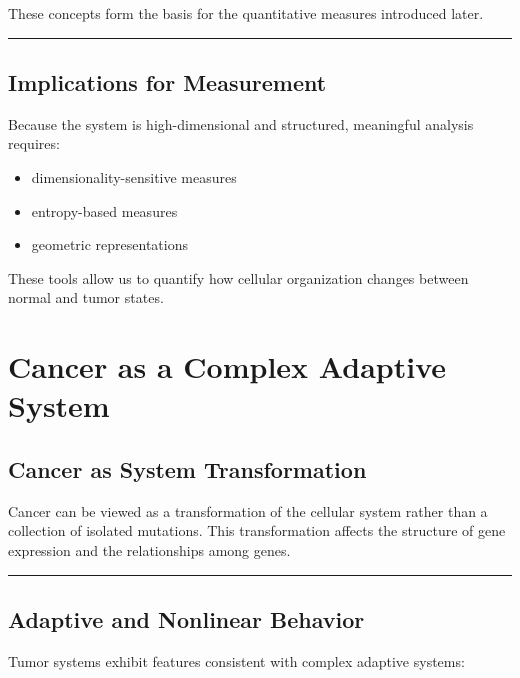 \documentclass[
  letterpaper,
  DIV=11,
  numbers=noendperiod,
  openany,
  oneside]{scrreprt}
\providecommand{\tightlist}{%
  \setlength{\itemsep}{0pt}\setlength{\parskip}{0pt}}
\begin{document}
These concepts form the basis for the quantitative measures introduced
later.

\begin{center}\rule{0.5\linewidth}{0.5pt}\end{center}

\section{Implications for
Measurement}\label{implications-for-measurement}

Because the system is high-dimensional and structured, meaningful
analysis requires:

\begin{itemize}
\tightlist
\item
  dimensionality-sensitive measures\\
\item
  entropy-based measures\\
\item
  geometric representations
\end{itemize}

These tools allow us to quantify how cellular organization changes
between normal and tumor states.

\chapter{Cancer as a Complex Adaptive
System}\label{cancer-as-a-complex-adaptive-system}

\section{Cancer as System
Transformation}\label{cancer-as-system-transformation}

Cancer can be viewed as a transformation of the cellular system rather
than a collection of isolated mutations. This transformation affects the
structure of gene expression and the relationships among genes.

\begin{center}\rule{0.5\linewidth}{0.5pt}\end{center}

\section{Adaptive and Nonlinear
Behavior}\label{adaptive-and-nonlinear-behavior}

Tumor systems exhibit features consistent with complex adaptive systems:
\end{document}
